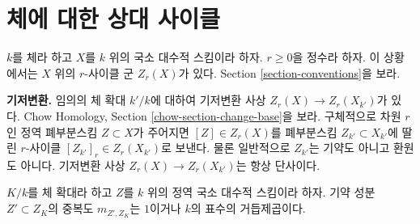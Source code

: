 \section{체에 대한 상대 사이클}
\label{section-relative-fields}

\noindent
$k$를 체라 하고 $X$를 $k$ 위의 국소 대수적 스킴이라 하자.
$r \geq 0$을 정수라 하자. 이 상황에서는 $X$ 위의
$r$-사이클 군 $Z_r(X)$가 있다. Section \ref{section-conventions}을 보라.

\medskip\noindent
{\bf 기저변환.} 임의의 체 확대 $k'/k$에 대하여 기저변환 사상
$Z_r(X) \to Z_r(X_{k'})$가 있다. Chow Homology, Section
\ref{chow-section-change-base}을 보라. 구체적으로 차원 $r$인
정역 폐부분스킴 $Z \subset X$가 주어지면 $[Z] \in Z_r(X)$를
폐부분스킴 $Z_{k'} \subset X_{k'}$에 딸린 $r$-사이클
$[Z_{k'}]_r \in Z_r(X_{k'})$로 보낸다. 물론 일반적으로
$Z_{k'}$는 기약도 아니고 환원도 아니다. 기저변환 사상
$Z_r(X) \to Z_r(X_{k'})$는 항상 단사이다.

\begin{lemma}
\label{lemma-multiplicities-field-extension}
$K/k$를 체 확대라 하고 $Z$를 $k$ 위의 정역 국소 대수적
스킴이라 하자. 기약 성분 $Z' \subset Z_K$의 중복도
$m_{Z', Z_K}$는 $1$이거나 $k$의 표수의 거듭제곱이다.
\end{lemma}

